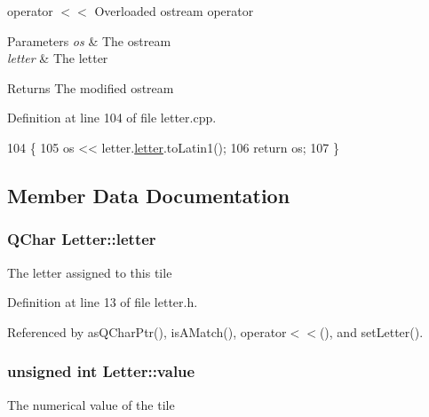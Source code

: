 operator $<$$<$ Overloaded ostream operator 


\begin{DoxyParams}{Parameters}
{\em os} & The ostream \\
\hline
{\em letter} & The letter \\
\hline
\end{DoxyParams}
\begin{DoxyReturn}{Returns}
The modified ostream 
\end{DoxyReturn}


Definition at line 104 of file letter.\-cpp.


\begin{DoxyCode}
104                                                        \{
105     os << letter.\hyperlink{class_letter_a430f7ba15c252da3874f641422090fbd}{letter}.toLatin1();
106     \textcolor{keywordflow}{return} os;
107 \}
\end{DoxyCode}


\subsection{Member Data Documentation}
\hypertarget{class_letter_a430f7ba15c252da3874f641422090fbd}{
\subsubsection[{letter}]{\setlength{\rightskip}{0pt plus 5cm}Q\-Char Letter\-::letter\hspace{0.3cm}{\ttfamily [private]}}}\label{class_letter_a430f7ba15c252da3874f641422090fbd}
The letter assigned to this tile 

Definition at line 13 of file letter.\-h.



Referenced by as\-Q\-Char\-Ptr(), is\-A\-Match(), operator$<$$<$(), and set\-Letter().

\hypertarget{class_letter_a5c6b1982acd4967eec202c562be7bc8f}{
\subsubsection[{value}]{\setlength{\rightskip}{0pt plus 5cm}unsigned int Letter\-::value\hspace{0.3cm}{\ttfamily [private]}}}\label{class_letter_a5c6b1982acd4967eec202c562be7bc8f}
The numerical value of the tile 

